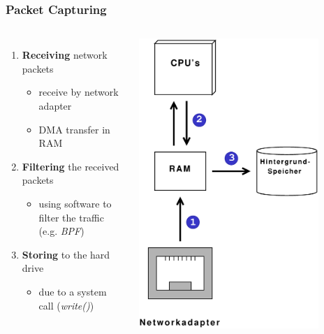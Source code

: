 \documentclass{beamer}
\begin{document}
\begin{frame}
\frametitle{Packet Capturing}
\begin{columns}
\vspace{-15em}
\begin{enumerate}
	\item \textbf{Receiving} network packets
		\begin{itemize}
			\item receive by network adapter
			\item DMA transfer in RAM \newline
		\end{itemize}
	\item \textbf{Filtering} the received packets 
		\begin{itemize}
			\item using software to filter the traffic (e.g. \emph{BPF})\newline
		\end{itemize}
	\item \textbf{Storing} to the hard drive
		\begin{itemize}
			\item due to a system call (\emph{write()})
		\end{itemize}
\end{enumerate}
\includegraphics [width=0.82\textwidth, keepaspectratio]{pics/HardwareView}
\end{columns}
\end{frame}
\end{document}
